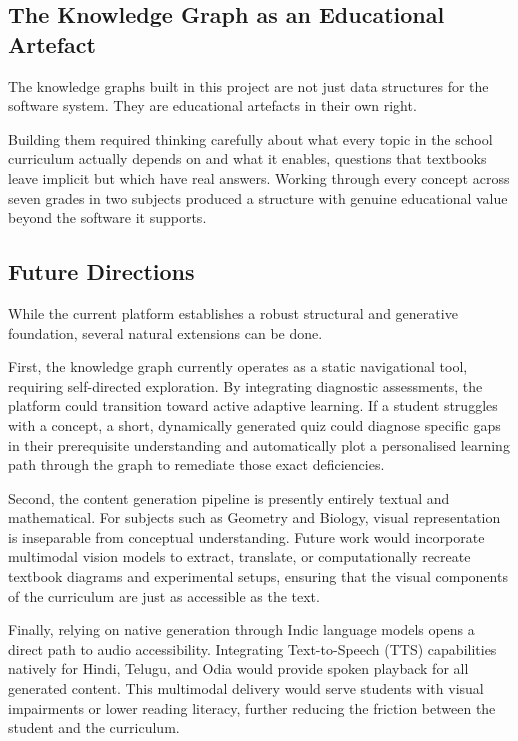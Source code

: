 \documentclass[12pt,a4paper]{article}
\begin{document}
\subsection{The Knowledge Graph as an Educational Artefact}

The knowledge graphs built in this project are not just data structures for the software system.
They are educational artefacts in their own right.

Building them required thinking carefully about what every topic in the school curriculum
actually depends on and what it enables, questions that textbooks leave implicit
but which have real answers.
Working through every concept across seven grades in two subjects produced a structure
with genuine educational value beyond the software it supports.
\subsection{Future Directions}

While the current platform establishes a robust structural and generative foundation, several natural extensions can be done. 

First, the knowledge graph currently operates as a static navigational tool, requiring self-directed exploration. By integrating diagnostic assessments, the platform could transition toward active adaptive learning. If a student struggles with a concept, a short, dynamically generated quiz could diagnose specific gaps in their prerequisite understanding and automatically plot a personalised learning path through the graph to remediate those exact deficiencies.

Second, the content generation pipeline is presently entirely textual and mathematical. For subjects such as Geometry and Biology, visual representation is inseparable from conceptual understanding. Future work would incorporate multimodal vision models to extract, translate, or computationally recreate textbook diagrams and experimental setups, ensuring that the visual components of the curriculum are just as accessible as the text.

Finally, relying on native generation through Indic language models opens a direct path to audio accessibility. Integrating Text-to-Speech (TTS) capabilities natively for Hindi, Telugu, and Odia would provide spoken playback for all generated content. This multimodal delivery would serve students with visual impairments or lower reading literacy, further reducing the friction between the student and the curriculum.
\end{document}
